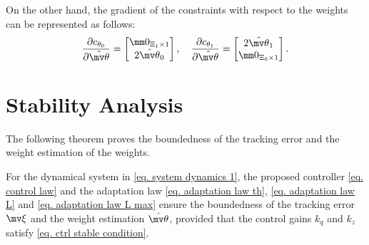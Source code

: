 \documentclass[letterpaper, 10 pt, conference]{ieeeconf}  %
\begin{document}
On the other hand, the gradient of the constraints with respect to the weights can be represented as follows:
\begin{equation}
    \frac{\partial c_{\theta_0}}{\partial{\hat{\mv\theta}}}
    = 
    \begin{bmatrix}
        \mm 0_{\Xi_1\times 1} \\
        2{\hat{\mv\theta}}_0 
    \end{bmatrix}
    ,\quad
    \frac{\partial c_{\theta_1}}{\partial{\hat{\mv\theta}}}    
    = 
    \begin{bmatrix}
        2{\hat{\mv\theta}}_1 \\
        \mm 0_{\Xi_0\times 1}
    \end{bmatrix}
    .
\end{equation}

\section{Stability Analysis}\label{sec:stability}

The following theorem proves the boundedness of the tracking error and the weight estimation of the weights.

\begin{theorem}
For the dynamical system in \eqref{eq. system dynamics 1}, the proposed controller \eqref{eq. control law} and the adaptation law \eqref{eq. adaptation law th}, \eqref{eq. adaptation law L} and \eqref{eq. adaptation law L max} ensure the boundedness of the tracking error $\mv \xi$ and the weight estimation ${\hat{\mv\theta}}$, provided that the control gains ${k_q}$ and ${k_z}$ satisfy \eqref{eq. ctrl stable condition}.
\end{theorem}
\end{document}
